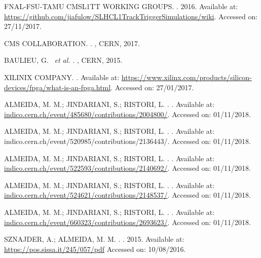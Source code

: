 \begin{thebibliography}{}
FNAL-FSU-TAMU CMSL1TT WORKING GROUPS.
. 2016.
Available at: \url{https://github.com/jiafulow/SLHCL1TrackTriggerSimulations/wiki}.
Accessed on: 27/11/2017.

CMS COLLABORATION.
.
, CERN, 2017.
	
BAULIEU, G. ~\textit{et al.}
.
, CERN, 2015.

XILINIX COMPANY.
.
Available at: \url{https://www.xilinx.com/products/silicon-devices/fpga/what-is-an-fpga.html}.
Accessed on: 27/01/2017.
	
ALMEIDA, M. M.; JINDARIANI, S.; RISTORI, L.
.
.
Available at: \url{indico.cern.ch/event/485680/contributions/2004800/}.
Accessed on: 01/11/2018.
	
ALMEIDA, M. M.; JINDARIANI, S.; RISTORI, L.
.
.
Available at: indico.cern.ch/event/520985/contributions/2136443/.
Accessed on: 01/11/2018.
	
ALMEIDA, M. M.; JINDARIANI, S.; RISTORI, L.
.
.
Available at: \url{indico.cern.ch/event/522593/contributions/2140692/}.
Accessed on: 01/11/2018.
	
ALMEIDA, M. M.; JINDARIANI, S.; RISTORI, L.
.
.
Available at: \url{indico.cern.ch/event/524621/contributions/2148537/}.
Accessed on: 01/11/2018.
	
ALMEIDA, M. M.; JINDARIANI, S.; RISTORI, L.
.
.
Available at: \url{indico.cern.ch/event/660323/contributions/2693623/}.
Accessed on: 01/11/2018.
	
SZNAJDER, A.; ALMEIDA, M. M.
.
.
2015.
Available at: \url{https://pos.sissa.it/245/057/pdf}
Accessed on: 10/08/2016.


\end{thebibliography}
